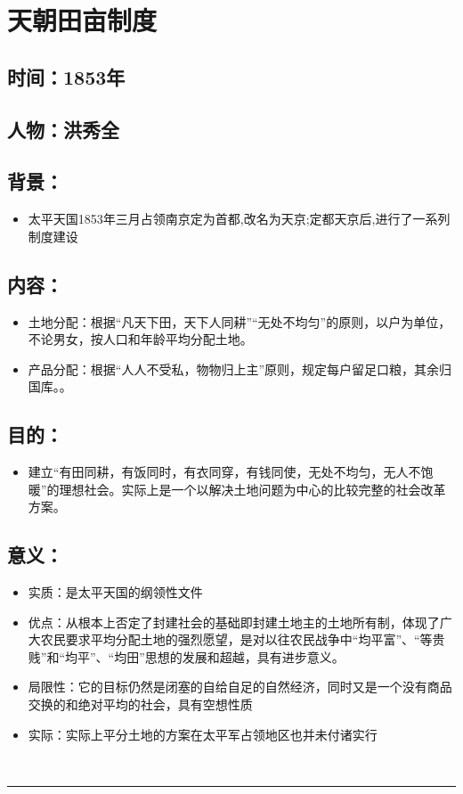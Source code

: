 \documentclass{article}
\begin{document}
\section*{天朝田亩制度}
\subsection*{时间：1853年}
\subsection*{人物：洪秀全}
\subsection*{背景：}
\begin{itemize}
	\item 太平天国1853年三月占领南京定为首都,改名为天京;定都天京后,进行了一系列制度建设
\end{itemize}
\subsection*{内容：}
\begin{itemize}
    \item 土地分配：根据“凡天下田，天下人同耕”“无处不均匀”的原则，以户为单位，不论男女，按人口和年龄平均分配土地。
    \item  产品分配：根据“人人不受私，物物归上主”原则，规定每户留足口粮，其余归国库。。
\end{itemize}
\subsection*{目的：}
\begin{itemize}
	\item 建立“有田同耕，有饭同时，有衣同穿，有钱同使，无处不均匀，无人不饱暖”的理想社会。实际上是一个以解决土地问题为中心的比较完整的社会改革方案。
\end{itemize}
\subsection*{意义：}
\begin{itemize}
	\item 实质：是太平天国的纲领性文件
    \item  优点：从根本上否定了封建社会的基础即封建土地主的土地所有制，体现了广大农民要求平均分配土地的强烈愿望，是对以往农民战争中“均平富”、“等贵贱”和“均平”、“均田”思想的发展和超越，具有进步意义。
    \item 局限性：它的目标仍然是闭塞的自给自足的自然经济，同时又是一个没有商品交换的和绝对平均的社会，具有空想性质
    \item 实际：实际上平分土地的方案在太平军占领地区也并未付诸实行
\end{itemize}
\ \hrule
\end{document}
